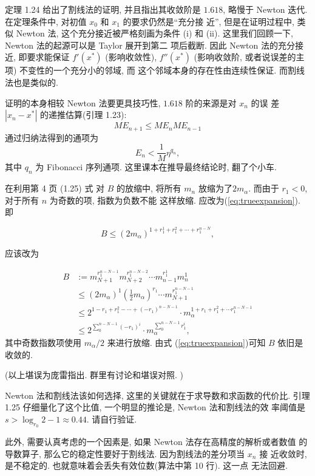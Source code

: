 \documentclass[a4paper]{ctexart}
\begin{document}
定理 1.24 给出了割线法的证明, 并且指出其收敛阶是 $1.618$, 略慢于
Newton 迭代. 在定理条件中, 对初值 $x_0$ 和 $x_1$ 的要求仍然是``充分接
近'', 但是在证明过程中, 类似 Newton 法, 这个充分接近被严格刻画为条件
(i) 和 (ii). 这里我们回顾一下, Newton 法的起源可以是 Taylor 展开到第二
项后截断. 因此 Newton 法的充分接近, 即要求能保证 $f'(x^*)$ (影响收敛性),
$f''(x^*)$ (影响收敛阶, 或者说误差的主项) 不变性的一个充分小的邻域, 而
这个邻域本身的存在性由连续性保证. 而割线法也是类似的.

证明的本身相较 Newton 法要更具技巧性, $1.618$ 阶的来源是对 $x_n$ 的误
差 $|x_n - x^*|$ 的递推估算(引理 1.23):
$$
ME_{n + 1} \leq ME_nME_{n - 1}
$$
通过归纳法得到的通项为
$$
E_n < \frac{1}{M} \eta^{q_n},
$$
其中 $q_n$ 为 Fibonacci 序列通项. 这里课本在推导最终结论时, 翻了个小车. 

在利用第 4 页 (1.25) 式 对 $B$ 的放缩中, 将所有 $m_n$ 放缩为了$2
m_{\alpha}$. 而由于 $r_1 < 0$, 对于所有 $n$ 为奇数的项, 指数为负数不能
这样放缩. 应改为(\ref{eq:trueexpansion}). 即

\begin{equation}
  B \leq \left(2 m_\alpha\right)^{1 + r_1^1 + r_1^2 + \cdots + r_1^{n - N}},
\end{equation}

应该改为

\begin{equation}
  \label{eq:trueexpansion}
  \begin{array}{ll}
    B &:=m_{N+1}^{r_1^{n-N-1}}m_{N+2}^{r_1^{n-N-2}}\cdots
    m_{n-1}^{r_1^1}m_n^1\\
    &\leq
    (2m_{\alpha})^{1}(\frac{1}{2}m_{\alpha})^{r_1}\cdots
    m_{N+1}^{r_1^{n-N-1}}\\
    &\leq 2^{1 - r_1 + r_1^2 -\cdots +
      (-r_1)^{n - N - 1}}\cdot m_{\alpha}^{1+r_1+r_1^2+\cdots r_1^{n -
        N - 1}}\\ &\leq 2^{\sum_{0}^{n - N - 1}(-r_1)^i}\cdot
    m_{\alpha}^{\sum_{0}^{n - N - 1}r_1^i},
  \end{array}
\end{equation}
其中奇数指数项使用 $m_{\alpha}/2$ 来进行放缩. 由式
(\ref{eq:trueexpansion})可知 $B$ 依旧是收敛的.

(以上堪误为庞雷指出. 群里有讨论和堪误对照. )

Newton 法和割线法该如何选择, 这里的关键就在于求导数和求函数的代价比.
引理 1.25 仔细量化了这个比值, 一个明显的推论是, Newton 法和割线法的效
率阈值是 $s > \log_{r_0}2 - 1 \approx 0.44$. 请自行验证.

此外, 需要认真考虑的一个因素是, 如果 Newton 法存在高精度的解析或者数值
的导数算子, 那么它的稳定性要好于割线法. 因为割线法的差分项当 $x_n$ 接
近收敛时, 是不稳定的. 也就意味着会丢失有效位数(算法中第 10 行). 这一点
无法回避.
\end{document}
